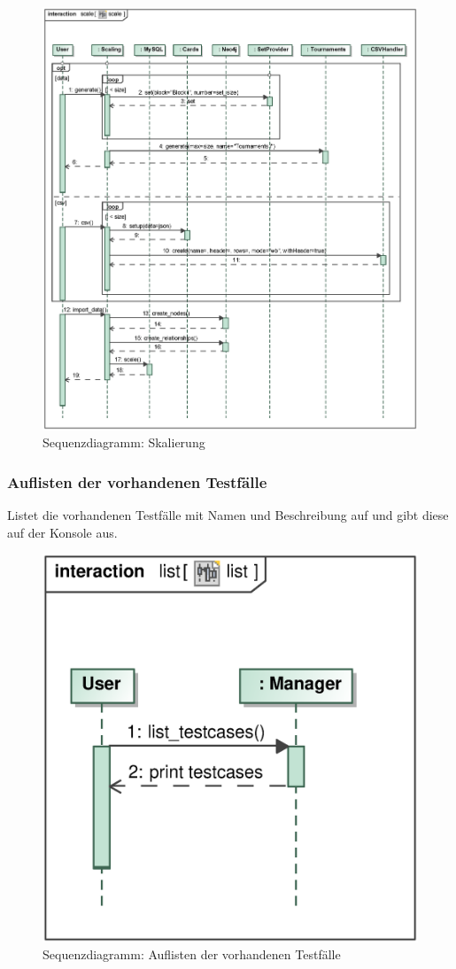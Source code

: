 \begin{figure}[H]
    \myfloatalign
    \includegraphics[width=1.1\textwidth]{gfx/MtGDeepAnalysis/cli_scale.eps}
    \caption{Sequenzdiagramm: Skalierung}
    \label{fig:seq:scale}
\end{figure}

\subsubsection{Auflisten der vorhandenen Testfälle} 
Listet die vorhandenen Testfälle mit Namen und Beschreibung auf und gibt diese auf der Konsole aus.

\begin{figure}[H]
    \myfloatalign
    \includegraphics[width=.65\textwidth]{gfx/MtGDeepAnalysis/cli_list.eps}
    \caption{Sequenzdiagramm: Auflisten der vorhandenen Testfälle}
    \label{fig:seq:list}
\end{figure}




